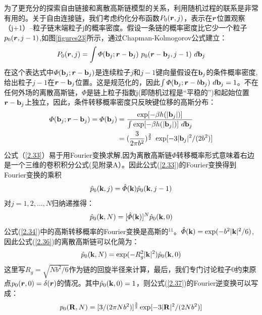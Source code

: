 为了更充分的探索自由链接和离散高斯链模型的关系，利用随机过程的联系是非常有用的。关于自由连接链，我们考虑约化分布函数$P_{0}(\bm{r},j)$，表示在$\bm{r}$位置观察（j+1）--粒子链末端粒子j的概率密度。假设一条链的概率密度比它少一个粒子$p_{0}(\bm{r},j-1)$,如图\ref{figures23}所示，通过Chapman-Kolmogorov公式建立：
\begin{equation}\label{2.33}
P_{0}(\bm{r},j)=\int  \varPhi (\mathbf{b}_{j};\bm{r}-\mathbf{b}_{j})~p_{0}(\bm{r}-\mathbf{b}_{j},j-1)~d\mathbf{b}_{j}
\end{equation}
在这个表达式中$\varPhi (\mathbf{b}_{j};\bm{r}-\mathbf{b}_{j})$是连续粒子$j$和$j-1$键向量假设在$\mathbf{b}_{j}$的条件概率密度,给出粒子$j-1$在$\bm{r}-\mathbf{b}_{j}$位置。这是规范化的，因此$\int  \varPhi (\mathbf{b}_{j};\bm{r}-b\mathbf{b}_{j})~d\mathbf{b}_{j}=1$。不在任何外场的离散高斯链，$\varPhi$是链上粒子指数j(即随机过程是“平稳的”)和起始位置$\bm{r}-\mathbf{b}_{j}$上独立，因此，条件转移概率密度只反映键位移的高斯分布：
\begin{equation}\label{2.34}
\begin{aligned}
\varPhi(\mathbf{b}_{j};\bm{r}-\mathbf{b}_{j})=\varPhi(\mathbf{b}_{j})&=\frac{\exp[-\beta h(|\mathbf{b}_{j}|)]}{\int \exp[-\beta h(|\mathbf{b}_{j}|)]~d\mathbf{b}_{j}} \\ &=(\frac{3}{2 \pi b^2})^{\frac{3}{2}}~\exp[-3|\mathbf{b}_{j}|^2 / (2b^2)]
\end{aligned}
\end{equation}
公式（\ref{2.33}）易于用Fourier变换求解,因为离散高斯链$\varPhi$转移概率形式意味着右边是一个三维的卷积积分公式(见附录A）。因此公式(\ref{2.33})的Fourier变换得到Fourier变换的乘积
\begin{equation}\label{2.35}
\hat{p}_{0}(\mathbf{k},j)=\hat{\varPhi}(\mathbf{k})\hat{p}_{0}(\mathbf{k},j-1)
\end{equation}
对$j=1,2,\dots ,N$归纳递推得：
\begin{equation}\label{2.36}
\hat{p}_{0}(\mathbf{k},N)=[\hat{\varPhi}(\mathbf{k})]^N\hat{p}_{0}(\mathbf{k},0)
\end{equation}
公式(\ref{2.34})中的高斯转移概率的Fourier变换是高斯的$^{11}$。$\hat{\varPhi}(\mathbf{k})=\exp(-b^2|\mathbf{k}|^2/6)$,因此公式(\ref{2.36})的离散高斯链可以化简为：
\begin{equation}\label{2.37}
\hat{p}_{0}(\mathbf{k},N)=\exp(-R_{g}^2|\mathbf{k}|^2)\hat{p}_{0}(\mathbf{k},0)
\end{equation}
这里写$R_{g}=\sqrt{Nb^2/6}$作为链的回旋半径来计算，最后，我们专门讨论粒子0约束原点$p_{0}(\bm{r},0)=\delta(\bm{r})$的情况。其中$\hat{p}_{0}(\mathbf{k},0)=1$，则公式(\ref{2.37})的Fourier逆变换可以写成：
\begin{equation}\label{2.38}
p_{0}(\mathbf{R},N)=[3/(2\pi Nb^2)]^\frac{3}{2}\exp[-3|\mathbf{R}|^2/(2Nb^2)]
\end{equation}

